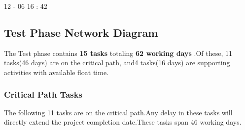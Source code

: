     12 -
    06 16 : 42 %

\subsection{Test Phase Network Diagram}

                 The Test phase contains \textbf{15 tasks} totaling \textbf{
                     62 working days}
                     .Of these,
    11 tasks(46 days) are on the critical path,
    and4 tasks(16 days) are supporting activities with available float time.

\vspace {
  0.5em
}

\subsubsection { Critical Path Tasks }

\noindent The following 11 tasks are on the critical
    path.Any delay in these tasks will directly extend the project completion
        date.These tasks span 46 working days.

\vspace {
  0.5em
}

